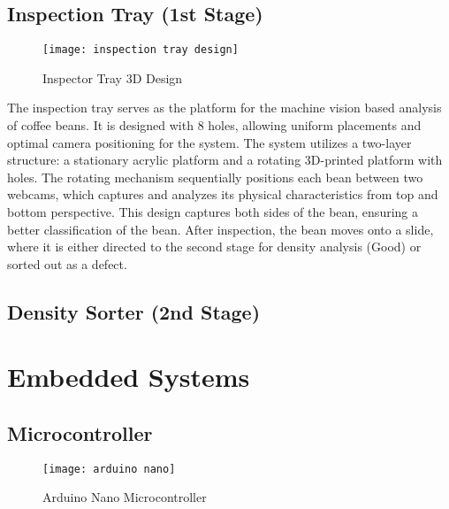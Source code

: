 \subsection{Inspection Tray (1st Stage)}

\begin{figure}[h]
    \centering
    \texttt{[image: inspection tray design]} %
    \caption{Inspector Tray 3D Design}
    \label{fig:inspection_tray}
\end{figure}

The inspection tray serves as the platform for the machine vision based analysis of coffee beans. It is designed with 8 holes, allowing uniform placements and optimal camera positioning for the system. The system utilizes a two-layer structure: a stationary acrylic platform and a rotating 3D-printed platform with holes. The rotating mechanism sequentially positions each bean between two webcams, which captures and analyzes its physical characteristics from top and bottom perspective. This design captures both sides of the bean, ensuring a better classification of the bean. After inspection, the bean moves onto a slide, where it is either directed to the second stage for density analysis (Good) or sorted out as a defect.

\subsection{Density Sorter (2nd Stage)}

\section{Embedded Systems}

\subsection{Microcontroller}

\begin{figure}[h]
    \centering
    \texttt{[image: arduino nano]} %
    \caption{Arduino Nano Microcontroller}
    \label{fig:arduino_nano}
\end{figure}

